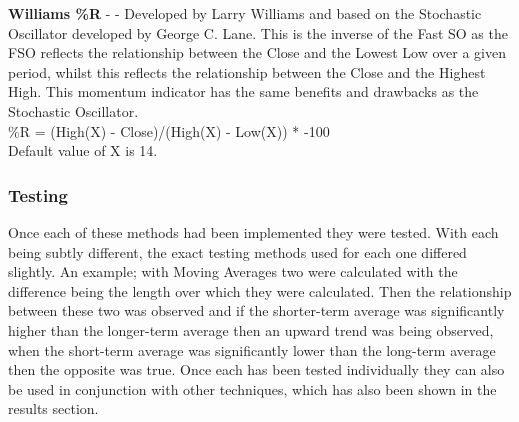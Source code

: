 \documentclass[conference]{IEEEtran}
\begin{document}

\noindent
\textbf{Williams \%R} - \cite{Murphy1999} - Developed by Larry Williams and based on the Stochastic Oscillator developed by George C. Lane. This is the inverse of the Fast SO as the FSO reflects the relationship between the Close and the Lowest Low over a given period, whilst this reflects the relationship between the Close and the Highest High. This momentum indicator has the same benefits and drawbacks as the Stochastic Oscillator.\\

\noindent
\%R = (High(X) - Close)/(High(X) - Low(X)) * -100\\
Default value of X is 14.\\

\subsubsection{Testing}

Once each of these methods had been implemented they were tested. With each being subtly different, the exact testing methods used for each one differed slightly. An example; with Moving Averages two were calculated with the difference being the length over which they were calculated. Then the relationship between these two was observed and if the shorter-term average was significantly higher than the longer-term average then an upward trend was being observed, when the short-term average was significantly lower than the long-term average then the opposite was true. Once each has been tested individually they can also be used in conjunction with other techniques, which has also been shown in the results section. 

\end{document}
